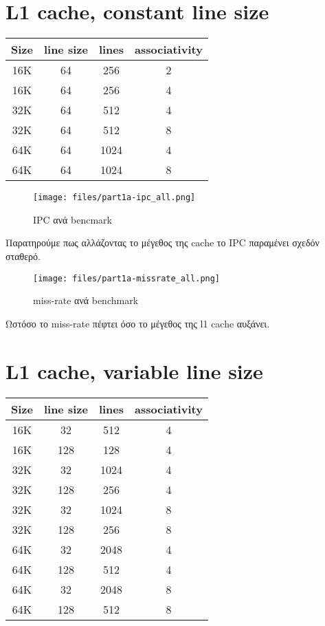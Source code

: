 \documentclass[a4paper,9pt]{article}
\begin{document}
\def\thesection {\roman{section}: }



\section{L1 cache, constant line size}
\begin{tabular}{c c c c}
    Size & line size & lines & associativity\\ 
    \hline
    \hline
    16K   & 64 &  256  & 2\\
    16K   & 64 &  256  & 4\\
    \hline
    32K   & 64 &  512  & 4\\
    32K   & 64 &  512  & 8\\
    \hline
    64K   & 64 &  1024 & 4\\
    64K   & 64 &  1024 & 8\\
\end{tabular}
\begin{figure}[H]
    \centering
    \texttt{[image: files/part1a-ipc\_all.png]}
    \caption{IPC ανά bencmark}
\end{figure}

Παρατηρούμε πως αλλάζοντας το μέγεθος της cache το IPC παραμένει σχεδόν
σταθερό.

\begin{figure}[H]
    \centering
    \texttt{[image: files/part1a-missrate\_all.png]}
    \caption{miss-rate ανά benchmark}
\end{figure}

Ωστόσο το miss-rate πέφτει όσο το μέγεθος της l1 cache αυξάνει.


\pagebreak


\section{L1 cache, variable line size}

\begin{tabular}{c c c c}
    Size & line size &lines & associativity\\ 
    \hline
    \hline
    16K & 32    & 512   & 4\\
    16K & 128   & 128   & 4\\
    \hline
    32K & 32    & 1024  & 4\\
    32K & 128   & 256   & 4\\
    32K & 32    & 1024  & 8\\
    32K & 128   & 256   & 8\\
    \hline
    64K & 32    & 2048  & 4\\
    64K & 128   & 512   & 4\\
    64K & 32    & 2048  & 8\\
    64K & 128   & 512   & 8\\
\end{tabular}
\end{document}
